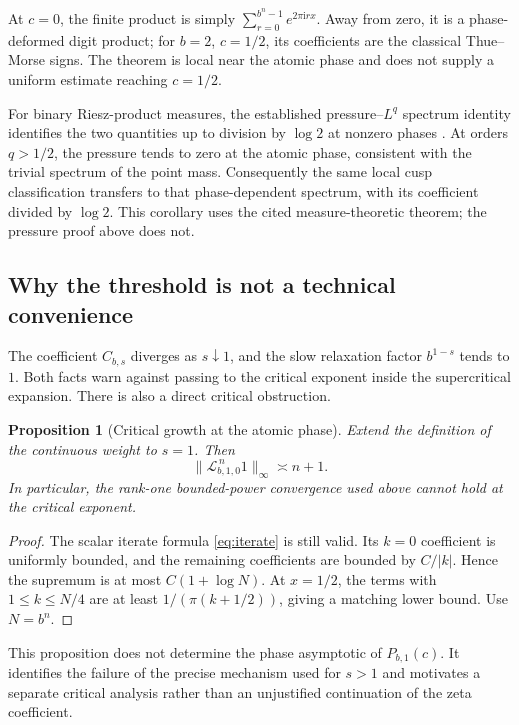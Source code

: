 \documentclass[11pt,a4paper]{article}
\numberwithin{equation}{section}
\newtheorem{proposition}[proposition]{Proposition}
\theoremstyle{definition}
\theoremstyle{remark}
\newcommand{\ii}{\mathrm i}
\newcommand{\Lop}{\mathcal L}
\begin{document}
At $c=0$, the finite product is simply
$\sum_{r=0}^{b^n-1}e^{2\pi\ii rx}$. Away from zero, it is a
phase-deformed digit product; for $b=2$, $c=1/2$, its coefficients are
the classical Thue--Morse signs. The theorem is local near the atomic
phase and does not supply a uniform estimate reaching $c=1/2$.

For binary Riesz-product measures, the established pressure--$L^q$
spectrum identity identifies the two quantities up to division by
$\log2$ at nonzero phases \cite[Theorem~2.6]{GKS}. At orders $q>1/2$,
the pressure tends to zero at the atomic phase, consistent with the
trivial spectrum of the point mass. Consequently the same local cusp
classification transfers to that phase-dependent spectrum, with its
coefficient divided by $\log2$. This corollary uses the cited
measure-theoretic theorem; the pressure proof above does not.

\subsection{Why the threshold is not a technical convenience}
The coefficient $C_{b,s}$ diverges as $s\downarrow1$, and the slow
relaxation factor $b^{1-s}$ tends to $1$. Both facts warn against passing
to the critical exponent inside the supercritical expansion.
There is also a direct critical obstruction.

\begin{proposition}[Critical growth at the atomic phase]
\label{prop:critical}
Extend the definition of the continuous weight to $s=1$. Then
\begin{equation}
 \|\Lop_{b,1,0}^{\,n}1\|_\infty\asymp n+1.
 \label{eq:critical-growth}
\end{equation}
In particular, the rank-one bounded-power convergence used above cannot
hold at the critical exponent.
\end{proposition}
\begin{proof}
The scalar iterate formula \cref{eq:iterate} is still valid. Its $k=0$
coefficient is uniformly bounded, and the remaining coefficients are
bounded by $C/|k|$. Hence the supremum is at most $C(1+\log N)$.
At $x=1/2$, the terms with $1\le k\le N/4$ are at least
$1/(\pi(k+1/2))$, giving a matching lower bound. Use $N=b^n$.
\end{proof}

This proposition does not determine the phase asymptotic of $P_{b,1}(c)$.
It identifies the failure of the precise mechanism used for $s>1$ and
motivates a separate critical analysis rather than an unjustified
continuation of the zeta coefficient.
\end{document}
